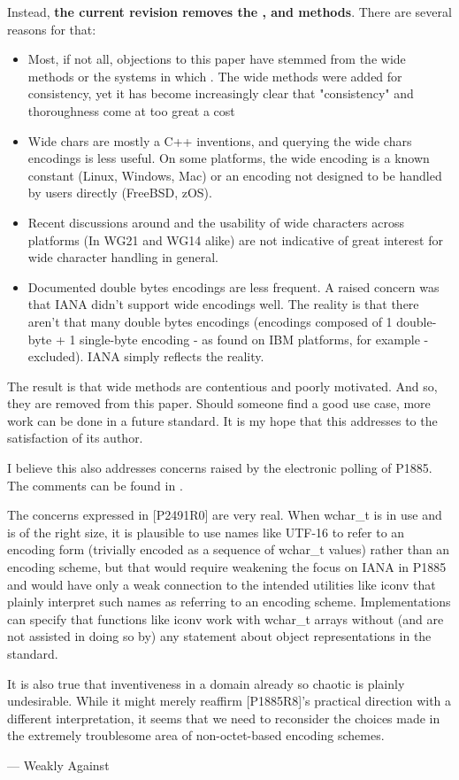 \documentclass{wg21}
\begin{document}
Instead, \textbf{the current revision removes the ,  and  methods}.
There are several reasons for that:
\begin{itemize}
    \item Most, if not all, objections to this paper have stemmed from the wide methods or the systems in which . The wide methods were added for consistency, yet it has become increasingly clear that "consistency" and thoroughness come at too great a cost
    \item Wide chars are mostly a C++ inventions, and querying the wide chars encodings is less useful. On some platforms, the wide encoding is a known constant (Linux, Windows, Mac) or an encoding not designed to be handled by users directly (FreeBSD, zOS).
    \item Recent discussions around  and the usability of wide characters across platforms (In WG21 and WG14 alike) are not indicative of great interest for wide character handling in general.
    \item Documented double bytes encodings are less frequent. A raised concern was that IANA didn't support wide encodings well. The reality is that there aren't that many double bytes encodings (encodings composed of 1 double-byte + 1 single-byte encoding - as found on IBM platforms, for example - excluded). IANA simply reflects the reality.
\end{itemize}

The result is that wide methods are contentious and poorly motivated. And so, they are removed from this paper.
Should someone find a good use case, more work can be done in a future standard.
It is my hope that this addresses  to the satisfaction of its author.

I believe this also addresses concerns raised by the electronic polling of P1885. The comments can be found in .

\begin{quoteblock}
    The concerns expressed in [P2491R0] are very real. When wchar_t is in use and is of the right size, it is plausible to use names like UTF-16 to refer to an encoding form (trivially encoded as a sequence of wchar_t values) rather than an encoding scheme, but that would require weakening the focus on IANA in P1885 and would have only a weak connection to the intended utilities like iconv that plainly interpret such names as referring to an encoding scheme. Implementations can specify that functions like iconv work with wchar_t arrays without (and are not assisted in doing so by) any statement about object representations in the standard.

    It is also true that inventiveness in a domain already so chaotic is plainly undesirable. While it might merely reaffirm [P1885R8]'s practical direction with a different interpretation, it seems that we need to reconsider the choices made in the extremely troublesome area of non-octet-based encoding schemes.

    — Weakly Against
\end{quoteblock}
\end{document}
